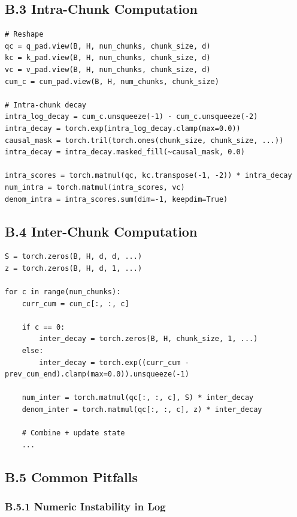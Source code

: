 \subsection{B.3 Intra-Chunk Computation}

\begin{lstlisting}
# Reshape
qc = q_pad.view(B, H, num_chunks, chunk_size, d)
kc = k_pad.view(B, H, num_chunks, chunk_size, d)
vc = v_pad.view(B, H, num_chunks, chunk_size, d)
cum_c = cum_pad.view(B, H, num_chunks, chunk_size)

# Intra-chunk decay
intra_log_decay = cum_c.unsqueeze(-1) - cum_c.unsqueeze(-2)
intra_decay = torch.exp(intra_log_decay.clamp(max=0.0))
causal_mask = torch.tril(torch.ones(chunk_size, chunk_size, ...))
intra_decay = intra_decay.masked_fill(~causal_mask, 0.0)

intra_scores = torch.matmul(qc, kc.transpose(-1, -2)) * intra_decay
num_intra = torch.matmul(intra_scores, vc)
denom_intra = intra_scores.sum(dim=-1, keepdim=True)
\end{lstlisting}

\subsection{B.4 Inter-Chunk Computation}

\begin{lstlisting}
S = torch.zeros(B, H, d, d, ...)
z = torch.zeros(B, H, d, 1, ...)

for c in range(num_chunks):
    curr_cum = cum_c[:, :, c]
    
    if c == 0:
        inter_decay = torch.zeros(B, H, chunk_size, 1, ...)
    else:
        inter_decay = torch.exp((curr_cum - prev_cum_end).clamp(max=0.0)).unsqueeze(-1)
    
    num_inter = torch.matmul(qc[:, :, c], S) * inter_decay
    denom_inter = torch.matmul(qc[:, :, c], z) * inter_decay
    
    # Combine + update state
    ...
\end{lstlisting}

\subsection{B.5 Common Pitfalls}

\subsubsection{B.5.1 Numeric Instability in Log}

